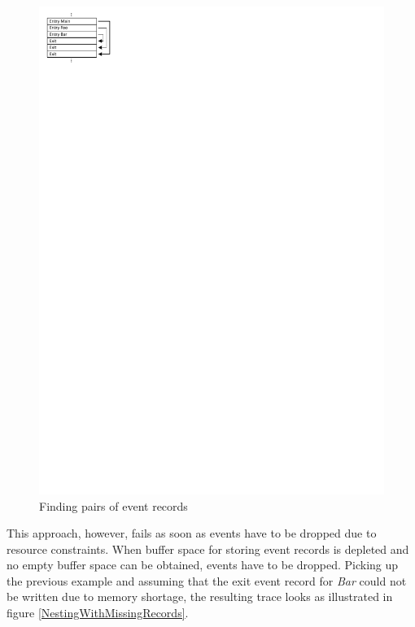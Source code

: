 \begin{figure}[htbp] 
\begin{centering} 
\includegraphics[scale=1, clip=true, viewport=0cm 26cm 5cm 30cm]{images/diagrams/NestingOk.pdf} 
\caption{Finding pairs of event records} 
\label{NestingOk} 
\end{centering} 
\end{figure}

This approach, however, fails as soon as events have to be dropped due to resource
constraints. When buffer space for storing event records is depleted and no
empty buffer space can be obtained, events have to be dropped. Picking up the previous
example and assuming that the exit event record for \emph{Bar} could not be written
due to memory shortage, the resulting trace looks as illustrated in figure 
\ref{NestingWithMissingRecords}.

